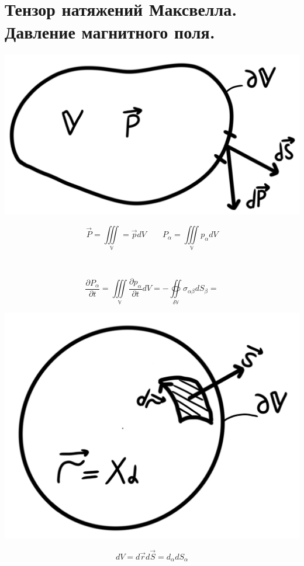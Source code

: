 \section{Тензор натяжений Максвелла. Давление магнитного поля.}

\begin{minipage}[c]{0.4\textwidth} %
    \includegraphics[width=\textwidth]{im/94.png}%
\end{minipage}%
\hfill
\begin{minipage}[c]{0.6\textwidth} %
    \[
    \vec{P}=\underset{\mathbb{V}}{\iiint}=\vec{p}dV 
    \qquad 
    P_{\alpha}=\underset{\mathbb{V}}{\iiint}p_{\alpha}dV
    \]
\end{minipage}

\( \text{ } \) 

\[
\frac{\partial P_{\alpha}}{\partial t}=
\underset{\mathbb{V}}{\iiint} \frac{\partial p_{\alpha}}{\partial t}dV=
-\underset{\delta \mathbb{V}}{\oiint} \sigma_{\alpha\beta}dS_{\beta} \boxed{=}
\]

\begin{minipage}[c]{0.4\textwidth} %
    \includegraphics[width=\textwidth]{im/95.png}%
\end{minipage}%
\hfill
\begin{minipage}[c]{0.6\textwidth} %
    \[
    dV=d\vec{r}d\vec{S}=d_{\alpha}dS_{\alpha}  
    \]
\end{minipage}

